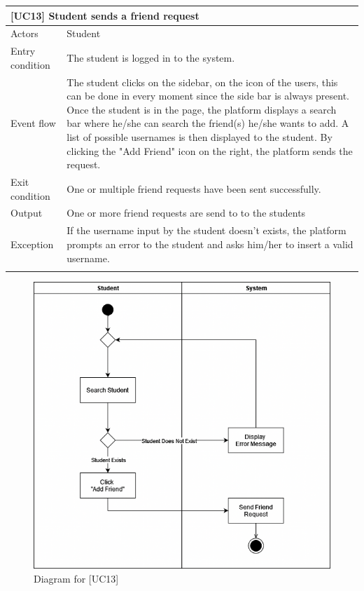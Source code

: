 \documentclass[12pt,oneside,a4paper]{article}
\begin{document}
\clearpage

\begin{table}[htbp]
\begin{tabular}{|l|p{12cm}|}
    \hline
    \multicolumn{2}{|l|}{\textbf{[UC13] Student sends a friend request}}\\
    \hline
    Actors & Student\\
    \hline
    Entry condition & The student is logged in to the system.\\
    \hline
    Event flow & The student clicks on the sidebar, on the icon of the users, this can be done in every moment since the side bar is always present. Once the student is in the page, the platform displays a search bar where he/she can search the friend(s) he/she wants to add. A list of possible usernames is then displayed to the student. By clicking the "Add Friend" icon on the right, the platform sends the request.\\
    \hline
    Exit condition & One or multiple friend requests have been sent successfully.\\
    \hline
    Output & One or more friend requests are send to to the students\\
    \hline
    Exception & If the username input by the student doesn't exists, the platform prompts an error to the student and asks him/her to insert a valid username.\\
    \lasthline
\end{tabular}
\end{table}

\clearpage

\begin{figure}[htbp]
    \centering
    \includegraphics[width=1\linewidth]{Images/Diagrams/FriendRequest.png}
    \caption{Diagram for [UC13]}
    \label{fig:enter-label}
\end{figure}
\end{document}
